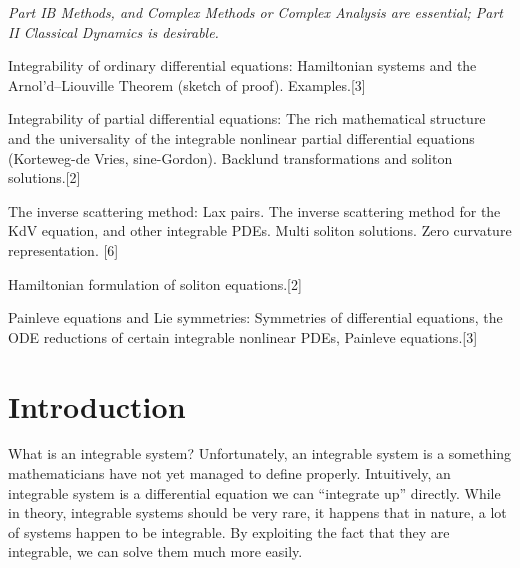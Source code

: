 \documentclass[a4paper]{article}
\begin{document}
\maketitle
{\small
\noindent\emph{Part IB Methods, and Complex Methods or Complex Analysis are essential; Part II Classical Dynamics is desirable.}

\vspace{10pt}
\noindent Integrability of ordinary differential equations: Hamiltonian systems and the Arnol'd--Liouville Theorem (sketch of proof). Examples.\hspace*{\fill}[3]

\vspace{5pt}
\noindent Integrability of partial differential equations: The rich mathematical structure and the universality of the integrable nonlinear partial differential equations (Korteweg-de Vries, sine-Gordon). Backlund transformations and soliton solutions.\hspace*{\fill}[2]

\vspace{5pt}
\noindent The inverse scattering method: Lax pairs. The inverse scattering method for the KdV equation, and other integrable PDEs. Multi soliton solutions. Zero curvature representation. \hspace*{\fill}[6]

\vspace{5pt}
\noindent Hamiltonian formulation of soliton equations.\hspace*{\fill}[2]

\vspace{5pt}
\noindent Painleve equations and Lie symmetries: Symmetries of differential equations, the ODE reductions of certain integrable nonlinear PDEs, Painleve equations.\hspace*{\fill}[3]%
}

\tableofcontents
\setcounter{section}{-1}
\section{Introduction}
What is an integrable system? Unfortunately, an integrable system is a something mathematicians have not yet managed to define properly. Intuitively, an integrable system is a differential equation we can ``integrate up'' directly. While in theory, integrable systems should be very rare, it happens that in nature, a lot of systems happen to be integrable. By exploiting the fact that they are integrable, we can solve them much more easily.
\end{document}
